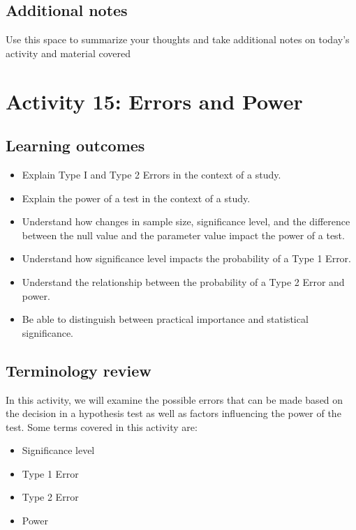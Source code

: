 \documentclass[
]{report}
\begin{document}
\subsection{Additional notes}\label{additional-notes-13}

Use this space to summarize your thoughts and take additional notes on today's activity and material covered

\newpage

\section{Activity 15: Errors and Power}\label{activity-15-errors-and-power}


\subsection{Learning outcomes}\label{learning-outcomes-15}

\begin{itemize}
\item
  Explain Type I and Type 2 Errors in the context of a study.
\item
  Explain the power of a test in the context of a study.
\item
  Understand how changes in sample size, significance level, and the difference between the null value and the parameter value impact the power of a test.
\item
  Understand how significance level impacts the probability of a Type 1 Error.
\item
  Understand the relationship between the probability of a Type 2 Error and power.
\item
  Be able to distinguish between practical importance and statistical significance.
\end{itemize}

\subsection{Terminology review}\label{terminology-review-13}

In this activity, we will examine the possible errors that can be made based on the decision in a hypothesis test as well as factors influencing the power of the test. Some terms covered in this activity are:

\begin{itemize}
\item
  Significance level
\item
  Type 1 Error
\item
  Type 2 Error
\item
  Power
\end{itemize}
\end{document}
